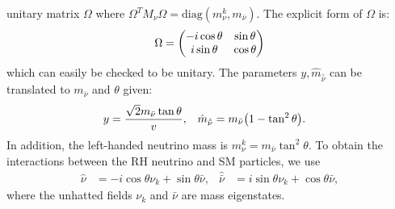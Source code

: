 \documentclass[a4paper,11pt]{article} \pdfoutput=1
\newcommand{\rhn}{\bar{\nu}}
\begin{document}
unitary matrix \(\Omega\) where
\(\Omega^{T}M_{\nu}\Omega = \mathrm{diag}(m^{k}_{\nu}, m_{\rhn})\). The
explicit form of \(\Omega\) is:
\begin{align}
	\Omega = \mqty(-i\cos\theta & \sin\theta \\ i\sin\theta & \cos\theta)
\end{align}
which can easily be checked to be unitary. The parameters
\(y, \hat{m}_{\hat{\rhn}}\) can be translated to \(m_{\rhn}\) and \(\theta\)
given:
\begin{align}
	y & = \frac{\sqrt{2}m_{\rhn}\tan\theta}{v}, & \hat{m}_{\hat{\rhn}} & = m_{\rhn}\qty(1-\tan^2\theta).
\end{align}
In addition, the left-handed neutrino mass is \(m^{k}_{\nu} = m_{\rhn}\tan^2\theta\).
To obtain the interactions between the RH neutrino and SM particles, we use
\begin{align}\label{eqn:framework:gauge_to_mass_eigenstates}
	\hat{\nu}  & = -i\cos\theta\nu_{k} + \sin\theta\rhn, &
	\hat{\rhn} & = i\sin\theta\nu_{k} + \cos\theta\rhn,
\end{align}
where the unhatted fields \(\nu_{k}\) and \(\rhn\) are mass eigenstates.
\end{document}
